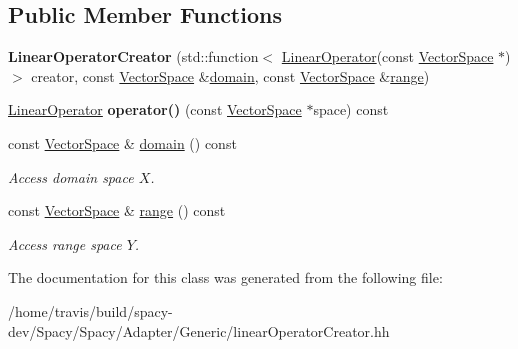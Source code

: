 \subsection*{Public Member Functions}
\begin{DoxyCompactItemize}
\item 
\hypertarget{classSpacy_1_1Generic_1_1LinearOperatorCreator_a212da2dedb9a6b0e8f45b8625364d832}{{\bfseries Linear\-Operator\-Creator} (std\-::function$<$ \hyperlink{classSpacy_1_1LinearOperator}{Linear\-Operator}(const \hyperlink{classSpacy_1_1VectorSpace}{Vector\-Space} $\ast$)$>$ creator, const \hyperlink{classSpacy_1_1VectorSpace}{Vector\-Space} \&\hyperlink{classSpacy_1_1OperatorBase_a2588f9b3e0188820c4c494e63293dc6f}{domain}, const \hyperlink{classSpacy_1_1VectorSpace}{Vector\-Space} \&\hyperlink{classSpacy_1_1OperatorBase_ab19d3b7a6f290b1079248f1e567e53d6}{range})}\label{classSpacy_1_1Generic_1_1LinearOperatorCreator_a212da2dedb9a6b0e8f45b8625364d832}

\item 
\hypertarget{classSpacy_1_1Generic_1_1LinearOperatorCreator_a34e9eee442ba1bffeab9905266500bf6}{\hyperlink{classSpacy_1_1LinearOperator}{Linear\-Operator} {\bfseries operator()} (const \hyperlink{classSpacy_1_1VectorSpace}{Vector\-Space} $\ast$space) const }\label{classSpacy_1_1Generic_1_1LinearOperatorCreator_a34e9eee442ba1bffeab9905266500bf6}

\item 
\hypertarget{classSpacy_1_1OperatorBase_a2588f9b3e0188820c4c494e63293dc6f}{const \hyperlink{classSpacy_1_1VectorSpace}{Vector\-Space} \& \hyperlink{classSpacy_1_1OperatorBase_a2588f9b3e0188820c4c494e63293dc6f}{domain} () const }\label{classSpacy_1_1OperatorBase_a2588f9b3e0188820c4c494e63293dc6f}

\begin{DoxyCompactList}\small\item\em Access domain space $X$. \end{DoxyCompactList}\item 
\hypertarget{classSpacy_1_1OperatorBase_ab19d3b7a6f290b1079248f1e567e53d6}{const \hyperlink{classSpacy_1_1VectorSpace}{Vector\-Space} \& \hyperlink{classSpacy_1_1OperatorBase_ab19d3b7a6f290b1079248f1e567e53d6}{range} () const }\label{classSpacy_1_1OperatorBase_ab19d3b7a6f290b1079248f1e567e53d6}

\begin{DoxyCompactList}\small\item\em Access range space $Y$. \end{DoxyCompactList}\end{DoxyCompactItemize}


The documentation for this class was generated from the following file\-:\begin{DoxyCompactItemize}
\item 
/home/travis/build/spacy-\/dev/\-Spacy/\-Spacy/\-Adapter/\-Generic/linear\-Operator\-Creator.\-hh\end{DoxyCompactItemize}
